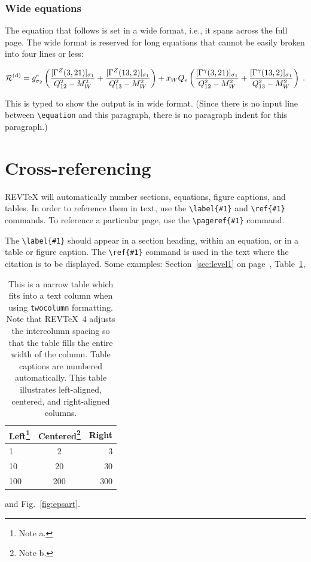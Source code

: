 \documentclass[%
 aip,
 amsmath,amssymb,
reprint, onecolumn %
]{revtex4-1}
\begin{document}
\subsubsection{Wide equations}
The equation that follows is set in a wide format, i.e., it spans
across the full page. The wide format is reserved for long equations
that cannot be easily broken into four lines or less:
\begin{widetext}
\begin{equation}
{\cal R}^{(\text{d})}=
 g_{\sigma_2}^e
 \left(
   \frac{[\Gamma^Z(3,21)]_{\sigma_1}}{Q_{12}^2-M_W^2}
  +\frac{[\Gamma^Z(13,2)]_{\sigma_1}}{Q_{13}^2-M_W^2}
 \right)
 + x_WQ_e
 \left(
   \frac{[\Gamma^\gamma(3,21)]_{\sigma_1}}{Q_{12}^2-M_W^2}
  +\frac{[\Gamma^\gamma(13,2)]_{\sigma_1}}{Q_{13}^2-M_W^2}
 \right)\;. \label{eq:wideeq}
\end{equation}
\end{widetext}
This is typed to show the output is in wide format.
(Since there is no input line between \verb+\equation+ and
this paragraph, there is no paragraph indent for this paragraph.)
\section{Cross-referencing}
REV\TeX{} will automatically number sections, equations, figure
captions, and tables. In order to reference them in text, use the
\verb+\label{#1}+ and \verb+\ref{#1}+ commands. To reference a
particular page, use the \verb+\pageref{#1}+ command.

The \verb+\label{#1}+ should appear in a section heading, within an
equation, or in a table or figure caption. The \verb+\ref{#1}+ command
is used in the text where the citation is to be displayed.  Some
examples: Section~\ref{sec:level1} on page~\pageref{sec:level1},
Table~\ref{tab:table1},%
\begin{table}
\caption{\label{tab:table1}This is a narrow table which fits into a
text column when using \texttt{twocolumn} formatting. Note that
REV\TeX~4 adjusts the intercolumn spacing so that the table fills the
entire width of the column. Table captions are numbered
automatically. This table illustrates left-aligned, centered, and
right-aligned columns.  }
\begin{ruledtabular}
\begin{tabular}{lcr}
Left\footnote{Note a.}&Centered\footnote{Note b.}&Right\\
\hline
1 & 2 & 3\\
10 & 20 & 30\\
100 & 200 & 300\\
\end{tabular}
\end{ruledtabular}
\end{table}
and Fig.~\ref{fig:epsart}.
\end{document}
